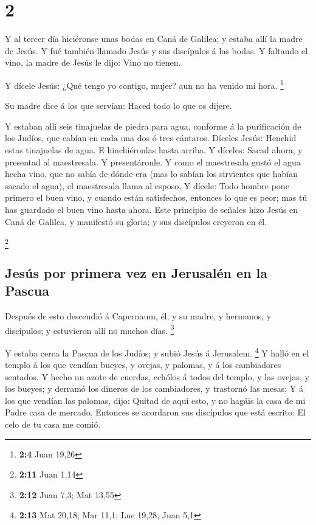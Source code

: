 \hypertarget{section-1}{%
\section{2}\label{section-1}}

 Y al tercer día hiciéronse unas bodas en Caná de Galilea; y
estaba allí la madre de Jesús.  Y fué también llamado Jesús
y sus discípulos á las bodas.  Y faltando el vino, la madre
de Jesús le dijo: Vino no tienen.

 Y dícele Jesús: ¿Qué tengo yo contigo, mujer? aun no ha
venido mi hora. \footnote{\textbf{2:4} Juan 19,26}

 Su madre dice á los que servían: Haced todo lo que os
dijere.

 Y estaban allí seis tinajuelas de piedra para agua,
conforme á la purificación de los Judíos, que cabían en cada una dos ó
tres cántaros.  Díceles Jesús: Henchid estas tinajuelas de
agua. E hinchiéronlas hasta arriba.  Y díceles: Sacad ahora,
y presentad al maestresala. Y presentáronle.  Y como el
maestresala gustó el agua hecha vino, que no sabía de dónde era (mas lo
sabían los sirvientes que habían sacado el agua), el maestresala llama
al esposo,  Y dícele: Todo hombre pone primero el buen
vino, y cuando están satisfechos, entonces lo que es peor; mas tú has
guardado el buen vino hasta ahora.  Este principio de
señales hizo Jesús en Caná de Galilea, y manifestó su gloria; y sus
discípulos creyeron en él.

\footnote{\textbf{2:11} Juan 1,14}

\hypertarget{jesuxfas-por-primera-vez-en-jerusaluxe9n-en-la-pascua}{%
\subsection{Jesús por primera vez en Jerusalén en la
Pascua}\label{jesuxfas-por-primera-vez-en-jerusaluxe9n-en-la-pascua}}

 Después de esto descendió á Capernaum, él, y su madre, y
hermanos, y discípulos; y estuvieron allí no muchos días. \footnote{\textbf{2:12}
  Juan 7,3; Mat 13,55}

 Y estaba cerca la Pascua de los Judíos; y subió Jesús á
Jerusalem. \footnote{\textbf{2:13} Mat 20,18; Mar 11,1; Luc 19,28; Juan
  5,1}  Y halló en el templo á los que vendían bueyes, y
ovejas, y palomas, y á los cambiadores sentados.  Y hecho
un azote de cuerdas, echólos á todos del templo, y las ovejas, y los
bueyes; y derramó los dineros de los cambiadores, y trastornó las mesas;
 Y á los que vendían las palomas, dijo: Quitad de aquí
esto, y no hagáis la casa de mi Padre casa de mercado. 
Entonces se acordaron sus discípulos que está escrito: El celo de tu
casa me comió.


